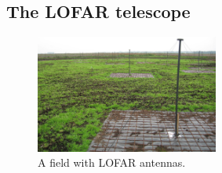 \documentclass{article}
\begin{document}

\subsection{The LOFAR telescope}

\begin{figure}[ht]
\begin{center}
\includegraphics[width=60mm]{figures/LBA-field.jpg}
\end{center}
\caption{A field with LOFAR antennas.}
\label{fig:lba-field}
\end{figure}
\end{document}

